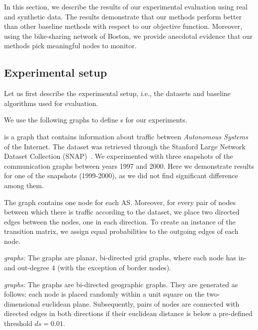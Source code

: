 In this section, we describe the results of our experimental evaluation using
real and synthetic data. The results demonstrate that our methods
perform better than other baseline methods with respect to our objective function. 
Moreover, using the bike-sharing network of Boston,
we provide anecdotal evidence that our methods pick meaningful nodes
to monitor.


\subsection{Experimental setup}

Let us first describe the experimental setup, i.e., the 
datasets and baseline algorithms used for evaluation.

 We use the following graphs to 
define {\markovchain}s for our experiments.

\emph{\autonomoussystems} is a graph that contains information about 
traffic  between \textit{Autonomous Systems} of the Internet. 
The dataset was retrieved through the Stanford Large Network Dataset 
Collection (SNAP)~\cite{snapnets}.
We experimented with three snapshots of the %
communication graphs between years 1997 and 2000. 
Here we demonstrate results for one of the snapshots (1999-2000), 
as we did not find significant difference among them.

The {\autonomoussystems} graph contains one node for each 
AS. Moreover, for every pair of nodes between which there is traffic according
to the dataset, we place two directed edges between the nodes, one in
each direction. To create an instance of the transition matrix,
we assign equal probabilities to the outgoing edges of each node.

\emph{{\grid} graphs:} The {\grid} graphs are 
planar, bi-directed grid graphs, 
where each node has in- and out-degree $4$ 
(with the exception of border nodes). 


\emph{{\geo} graphs:} The {\geo} graphs are 
bi-directed geographic graphs. They are generated as follows:
each node is placed randomly within a unit square 
on the two-dimensional euclidean plane.
Subsequently, pairs of nodes are connected with directed edges in both
directions if their euclidean distance is below a pre-defined threshold
$ds = 0.01$. 


